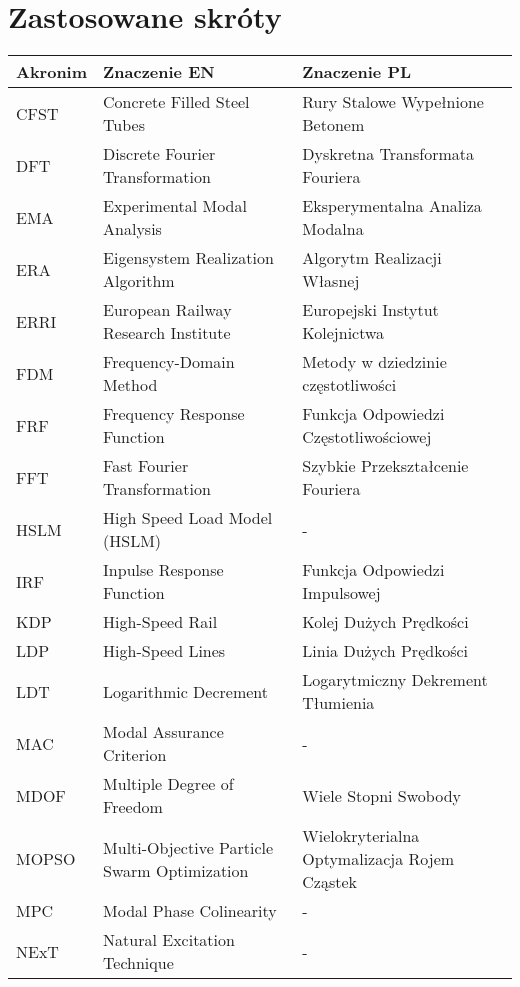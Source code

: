 \thispagestyle{plain}
\section*{Zastosowane skróty}
\makeatletter
\setlength{\@fptop}{0pt}
\makeatother
\begin{table}[H]
	\footnotesize
	\setlength\extrarowheight{5pt}
	\begin{tabular}{Z{0.1\textwidth} Z{0.4\textwidth} Z{0.4\textwidth}}
		\toprule
		\textbf{Akronim} & \textbf{Znaczenie EN} & \textbf{Znaczenie PL} 					\\ \midrule
		CFST		& Concrete Filled Steel Tubes	& Rury Stalowe Wypełnione Betonem \\
		DFT		& Discrete Fourier Transformation	& Dyskretna Transformata Fouriera \\ %
		EMA     & Experimental Modal Analysis         & Eksperymentalna Analiza Modalna         \\ %
		ERA		& Eigensystem Realization Algorithm & Algorytm Realizacji Własnej \\ %
		ERRI	& European Railway Research Institute & Europejski Instytut Kolejnictwa \\ %
		FDM		& Frequency-Domain Method & Metody w dziedzinie częstotliwości \\
		FRF		& Frequency Response Function	& Funkcja Odpowiedzi Częstotliwościowej \\ %
		FFT		& Fast Fourier Transformation	& Szybkie Przekształcenie Fouriera \\ %
		HSLM	& High Speed Load Model (HSLM) & - \\ %
		IRF		& Inpulse Response Function & Funkcja Odpowiedzi Impulsowej \\ %
		KDP		& High-Speed Rail		&Kolej Dużych Prędkości 				\\  %
		LDP		& High-Speed Lines							&Linia Dużych Prędkości 		\\ %
		LDT		& Logarithmic Decrement		& Logarytmiczny Dekrement Tłumienia \\ %
		MAC		& Modal Assurance Criterion & - \\
		MDOF	& Multiple Degree of Freedom & Wiele Stopni Swobody \\ %
		MOPSO	& Multi-Objective Particle Swarm Optimization & Wielokryterialna Optymalizacja Rojem Cząstek \\
		MPC		& Modal Phase Colinearity & - \\
		NExT 	& Natural Excitation Technique & - \\ %

\end{tabular}
\end{table}
